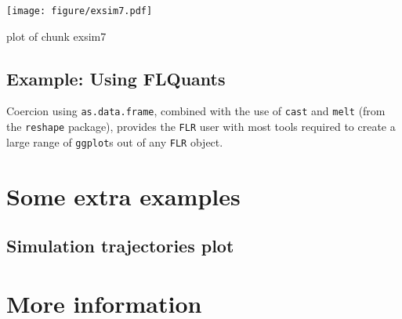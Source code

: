 \documentclass{tufte-handout}
\newenvironment{Shaded}{}{}
\newcommand{\KeywordTok}[1]{\textcolor[rgb]{0.00,0.44,0.13}{\textbf{{#1}}}}
\newcommand{\DataTypeTok}[1]{\textcolor[rgb]{0.56,0.13,0.00}{{#1}}}
\newcommand{\FloatTok}[1]{\textcolor[rgb]{0.25,0.63,0.44}{{#1}}}
\newcommand{\StringTok}[1]{\textcolor[rgb]{0.25,0.44,0.63}{{#1}}}
\newcommand{\NormalTok}[1]{{#1}}
\begin{document}
\begin{Shaded}
\end{Shaded}
\begin{marginfigure}
\centering
\texttt{[image: figure/exsim7.pdf]}
\caption{plot of chunk exsim7}
\end{marginfigure}

\subsection{Example: Using FLQuants}

Coercion using \texttt{as.data.frame}, combined with the use of
\texttt{cast} and \texttt{melt} (from the \texttt{reshape} package),
provides the \texttt{FLR} user with most tools required to create a
large range of \texttt{ggplot}s out of any \texttt{FLR} object.

\section{Some extra examples}

\subsection{Simulation trajectories plot}

\section{More information}
\end{document}
